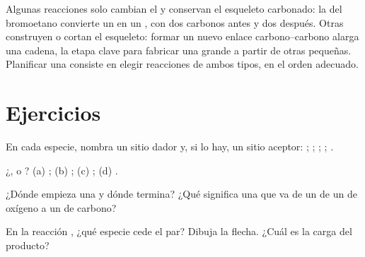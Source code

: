 \begin{remark}\label{rem:g12:curly-arrows:skeleton}
Algunas reacciones solo cambian el  y conservan el
esqueleto carbonado: la  del bromoetano convierte un
 en un , con dos carbonos antes y dos después. Otras
construyen o cortan el esqueleto: formar un nuevo enlace carbono--carbono
alarga una cadena, la etapa clave para fabricar una  grande a
partir de otras pequeñas. Planificar una  consiste en elegir
reacciones de ambos tipos, en el orden adecuado.
\end{remark}

\section{Ejercicios}

\begin{exercise}[$\star$]\label{exo:g12:curly-arrows:1}
En cada especie, nombra un sitio dador y, si lo hay, un sitio aceptor:
; ; ; ; .
\end{exercise}

\begin{exercise}[$\star$]\label{exo:g12:curly-arrows:2}
¿,  o ?
(a) ;
(b) ;
(c) ;
(d) .
\end{exercise}

\begin{exercise}[$\star$]\label{exo:g12:curly-arrows:3}
¿Dónde empieza una  y dónde termina? ¿Qué significa una
 que va de un  de un  de oxígeno a un  de
carbono?
\end{exercise}

\begin{exercise}[$\star$]\label{exo:g12:curly-arrows:4}
En la reacción , ¿qué especie cede el par? Dibuja la
flecha. ¿Cuál es la carga del producto?
\end{exercise}

